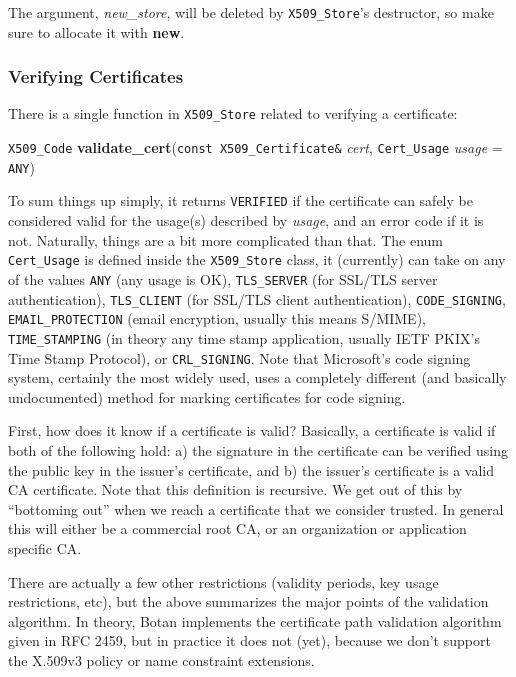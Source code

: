 \documentclass{article}
\newcommand{\function}[1]{\textbf{#1}}
\newcommand{\type}[1]{\texttt{#1}}
\renewcommand{\arg}[1]{\textsl{#1}}
\begin{document}
The argument, \arg{new\_store}, will be deleted by \type{X509\_Store}'s
destructor, so make sure to allocate it with \function{new}.

\pagebreak

\subsubsection{Verifying Certificates}

There is a single function in \type{X509\_Store} related to verifying a
certificate:

\type{X509\_Code}
\function{validate\_cert}(\type{const X509\_Certificate\&} \arg{cert},
                          \type{Cert\_Usage} \arg{usage} = \type{ANY})

To sum things up simply, it returns \type{VERIFIED} if the certificate can
safely be considered valid for the usage(s) described by \arg{usage}, and an
error code if it is not. Naturally, things are a bit more complicated than
that. The enum \type{Cert\_Usage} is defined inside the \type{X509\_Store}
class, it (currently) can take on any of the values \type{ANY} (any usage is
OK), \type{TLS\_SERVER} (for SSL/TLS server authentication), \type{TLS\_CLIENT}
(for SSL/TLS client authentication), \type{CODE\_SIGNING},
\type{EMAIL\_PROTECTION} (email encryption, usually this means S/MIME),
\type{TIME\_STAMPING} (in theory any time stamp application, usually IETF
PKIX's Time Stamp Protocol), or \type{CRL\_SIGNING}. Note that Microsoft's code
signing system, certainly the most widely used, uses a completely different
(and basically undocumented) method for marking certificates for code signing.

First, how does it know if a certificate is valid? Basically, a certificate is
valid if both of the following hold: a) the signature in the certificate can be
verified using the public key in the issuer's certificate, and b) the issuer's
certificate is a valid CA certificate. Note that this definition is
recursive. We get out of this by ``bottoming out'' when we reach a certificate
that we consider trusted. In general this will either be a commercial root CA,
or an organization or application specific CA.

There are actually a few other restrictions (validity periods, key usage
restrictions, etc), but the above summarizes the major points of the validation
algorithm. In theory, Botan implements the certificate path validation
algorithm given in RFC 2459, but in practice it does not (yet), because we
don't support the X.509v3 policy or name constraint extensions.
\end{document}
